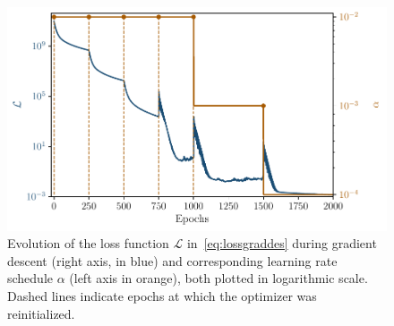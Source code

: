 \documentclass[11pt,a4paper]{article}
\begin{document}
	\begin{figure}
		\centering
		\includegraphics[scale = 0.75]{Figures/Loss_grad_des_21_05_2025.pdf}
		\caption{Evolution of the loss function $\mathcal{L}$ in~\eqref{eq:lossgraddes} during gradient descent (right axis, in blue) and corresponding learning rate schedule $\alpha$ (left axis in orange), both plotted in logarithmic scale. Dashed lines indicate epochs at which the optimizer was reinitialized.}
		\label{fig:loss_grad_des}
	\end{figure}
\end{document}
